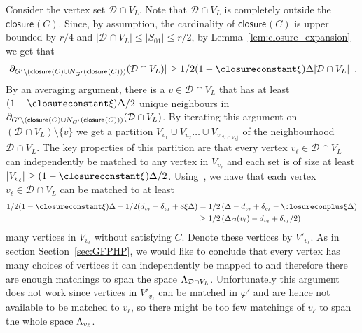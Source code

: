 \documentclass{article}
\providecommand{\abs}[1]{\lvert#1\rvert}
\newcommand{\boundary}[1]{\ensuremath{\partial #1}}
\newcommand{\set}[1]{\{ #1 \}}
\newcommand{\setsize}[1]{\lvert#1\rvert}
\newcommand{\disjointunion}{\overset{.}{\cup}}
\newcommand{\eqperiod}{\enspace .}
\newcommand{\refsec}[1]{Section~\ref{#1}}
\newcommand{\neigh}[2][]{N_{{#1}}(#2)}
\newcommand{\uniqueNeigh}[2][]{\boundary_{{#1}} ({#2})}
\renewcommand{\deg}[2][XXXXXXXXXXXX]{\Delta_{#1}(#2)}
\newcommand{\diff}{\xi}
\newcommand{\GdegMax}{\Delta}
\newcommand{\V}[1][]{V_{#1}}
\newcommand{\Vl}{\V[L]}
\newcommand{\Gprime}{G'}
\newcommand{\thr}[1]{ \ensuremath d_{{#1}} }
\newcommand{\adv}[1]{\delta_{{#1}}}
\newcommand{\linspace}[1][]{\ensuremath \Lambda_{{#1}}}
\newcommand{\closure}[2][]{\mathsf{closure}_{{#1}}(#2)}
\newcommand{\diffclosure}[1][]{D_{{#1}}}
\renewcommand{\diffclosure}[1][]{\mathcal{D}_{{#1}}}
\newcommand{\matchb}{\varphi'}
\numberwithin{equation}{section}
\begin{document}
  Consider the vertex set $\diffclosure \cap \Vl$. Note that 
  $\diffclosure \cap \Vl$ is completely
  outside the $\closure{C}$. Since, by assumption, the cardinality of $\closure{C}$ 
  is upper bounded by $r /
  4$ and $\abs{\diffclosure \cap \Vl} \le \abs{S_{01}} \le r / 2$, by 
  Lemma~\ref{lem:closure_expansion}
  we get that 
  \begin{equation}
  \begin{aligned}
    \abs{ 
    \uniqueNeigh[ {\Gprime \setminus 
    (\closure{C} \cup \neigh[\Gprime]{ {\closure{C}} })} ]
    {\diffclosure \cap \Vl} } 
    \ge 
    1/2(1 - \closureconstant \diff)
    \GdegMax \setsize{\diffclosure \cap \Vl}
    \eqperiod
  \end{aligned}
  \end{equation}
  By an averaging 
  argument, there is a $v \in
  \diffclosure \cap \Vl$ that has at least 
  $(1 - \closureconstant \diff)\GdegMax/2$ unique
  neighbours in 
  $\uniqueNeigh[ {\Gprime \setminus (\closure{C} \cup 
  \neigh[\Gprime]{\closure{C}})} ]
  {\diffclosure \cap \Vl}$.
  By iterating this argument on $(\diffclosure \cap \Vl) \setminus \set{ v }$
  we get a partition 
  $V_{v_1} \disjointunion V_{v_2} \ldots 
  \disjointunion V_{v_{\setsize{\diffclosure \cap \Vl}}}$
  of the neighbourhood $\diffclosure \cap \Vl$. The key properties
  of this partition are that every vertex 
  $v_\ell \in \diffclosure \cap \Vl$ can independently 
  be matched 
  to any vertex in $V_{v_\ell}$ and each set is of size at least
  $\setsize{V_{v_\ell}} \ge (1 - \closureconstant \diff)\GdegMax/2$.
  Using~, we have that each vertex 
  $v_\ell \in \diffclosure\cap\Vl$ can be matched to at least
  \begin{equation}
  \begin{aligned}
  	1/2 (1 - \closureconstant \diff)\GdegMax - 
  	1/2 (\thr{v_\ell} - \adv{v_\ell} + 8 \diff \GdegMax)
  	&= 1/2 \left( \GdegMax - \thr{v_\ell} + \adv{v_\ell} - 
  	\closureconplus \diff \GdegMax \right)\\
  	&\ge 1/2 \left(\deg[G]{v_\ell} - \thr{v_\ell} + \adv{v_\ell}/2 \right)
  \end{aligned}
  \end{equation}
many vertices in $V_{v_\ell}$ without satisfying $C$. Denote these vertices
  by $V'_{v_\ell}$.
  As in section \refsec{sec:GFPHP}, we would like to conclude that
  every vertex has many choices of vertices it can independently be mapped to and
  therefore there are enough matchings to span the
  space $\linspace[\diffclosure \cap \Vl]$.
  Unfortunately this argument does
  not work since vertices in $V'_{v_\ell}$ can be matched in
  $\matchb$ and are hence not available to be matched to
  $v_\ell$, so there might be too few matchings of $v_\ell$ to span the whole space $\linspace[v_\ell]$.
\end{document}
